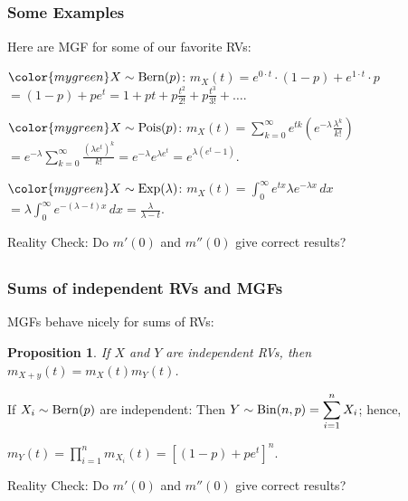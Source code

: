 \documentclass[aspectratio=169,xcolor={table,dvipsnames}]{beamer}
\newcommand{\cpink}[1]{{\color{mypink}#1}}
\newcommand{\cblu}[1]{{\color{myblue}#1}}
\newcommand{\cgrn}[1]{{\color{mygreen}#1}}
\newcommand{\ds}{\displaystyle}
\def\Bern{\mathop{\rm Bern}}
\def\Bin{\mathop{\rm Bin}}
\def\Pois{\mathop{\rm Pois}}
\def\Exp{\mathop{\rm Exp}}
\newtheorem{propo}[thm]{Proposition}
\begin{document}
\begin{frame}
  \section{}
  \frametitle{Some Examples} 
\cblu{Here are MGF for some of our favorite RVs: 
\pause

$\cgrn{X\sim \Bern (p)}$: $m_{X}(t) = e^{0\cdot t}\cdot (1-p) + e^{1\cdot t}\cdot p$
$ = (1-p) + pe^{t} = 1 + pt + p\frac{t^{2}}{2!}+ p\frac{t^{3}}{3!}+\dots $.

\pause

$\cgrn{X\sim \Pois (p)}$: $\ds m_{X}(t) = \sum_{k=0}^{\infty} e^{tk}\left(e^{-\lambda}\frac{\lambda^{k}}{k!}\right)$
$\ds = e^{-\lambda}\sum_{k=0}^{\infty} \frac{(\lambda e^{t})^{k}}{k!} =
e^{-\lambda}e^{\lambda e^{t}} = e^{\lambda (e^{t}-1)}$. 
\pause

$\cgrn{X\sim \Exp (\lambda )}$: $\ds m_{X}(t) = \int_{0}^{\infty} e^{tx}\lambda
e^{-\lambda x}\,dx$
$\ds  = \lambda \int_{0}^{\infty} e^{-(\lambda - t)x}\,dx = \frac{\lambda}{\lambda -t}$. 

\pause

\cpink{Reality Check: Do $m'(0)$ and $m''(0)$ give correct results?}
}
\pause


\vskip 5in
\end{frame}


\begin{frame}
  \section{}
  \frametitle{Sums of independent RVs and MGFs} 
\cblu{MGFs behave nicely for sums of RVs: 
\begin{propo}
If $X$ and $Y$ are \emph{independent} RVs, then $\ds m_{X+y}(t) = m_{X}(t)m_{Y}(t)$. 
\end{propo}
\pause

\cgrn{If $X_{i}\sim \Bern (p)$ are independent}: Then $ \ds Y\sim \Bin(n,p) = \sum_{i=1}^{n} X_{i}$; hence,

$\ds m_{Y}(t) = \prod_{i=1}^{n}m_{X_{i}}(t) = \left[ (1-p) + pe^{t} \right]^{n}$.

\pause

\cpink{Reality Check: Do $m'(0)$ and $m''(0)$ give correct results?}
}
\pause


\vskip 5in
\end{frame}
\end{document}
